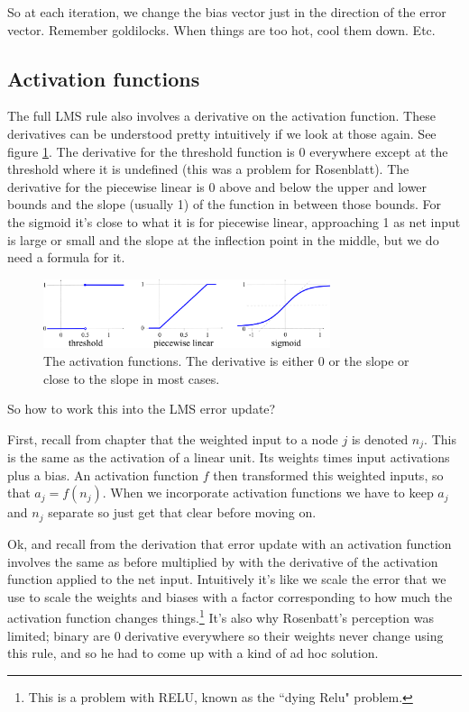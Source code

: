 So at each iteration, we change the bias vector just in the direction of the error vector. Remember goldilocks. When things are too hot, cool them down. Etc.

\subsection{Activation functions}

The full LMS rule also involves a derivative on the activation function. These derivatives can be understood pretty intuitively if we look at those again. See figure \ref{derivativesActFunctions}. The derivative for the threshold function is 0 everywhere except at the threshold where it is undefined (this was a problem for Rosenblatt). The derivative for the piecewise linear is 0 above and below the upper and lower bounds and the slope (usually 1) of the function in between those bounds. For the sigmoid it's close to what it is for piecewise linear, approaching 1 as net input is large or small and the slope at the inflection point in the middle, but we do need a formula for it.

\begin{figure}[h]
\centering
\includegraphics[width=0.75\textwidth]{images/graph_binary.pdf}
\caption[Jeff Yoshimi.]{The activation functions. The derivative is either 0 or the slope or close to the slope in most cases. }
\label{derivativesActFunctions}
\end{figure}

So how to work this into the LMS error update?

First, recall from chapter  that the weighted input to a node $j$ is denoted $n_j$. This is the same as the activation of a linear unit. Its weights times input activations plus a bias. An activation function $f$ then transformed this weighted inputs, so that $a_j = f(n_j)$. When we incorporate activation functions we have to keep $a_j$ and $n_j$ separate so just get that clear before moving on.

Ok, and recall from the derivation that error update with an activation function involves the same as before multiplied by with the derivative of the activation function applied to the net input. Intuitively it's like we scale the error that we use to scale the weights and biases with a factor corresponding to how much the activation function changes things.\footnote{This is a problem with RELU, known as the ``dying Relu" problem.}  It's also why Rosenbatt's perception was limited; binary are 0 derivative everywhere so their weights never change using this rule, and so he had to come up with a kind of ad hoc solution.

